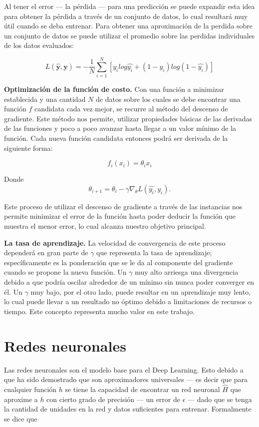 Al tener el error --- la pérdida --- para una predicción se puede expandir esta idea para obtener la pérdida a través de un conjunto de datos, lo cual resultará muy útil cuando se deba entrenar. Para obtener una aproximación de la perdida sobre un conjunto de datos se puede utilizar el promedio sobre las perdidas individuales de los datos evaluados:

\[ L(\mathbf{\hat{y}}, \mathbf{y}) = - \frac{1}{N} \sum_{i = 1}^{N} [y_i log\hat{y_i} + (1 - y_i)log(1 - \hat{y_i})] \]

\textbf{Optimización de la función de costo.} Con una función a minimizar establecida y una cantidad $N$ de datos sobre los cuales se debe encontrar una función $f$ candidata cada vez mejor, se recurre al método del descenso de gradiente. Este método nos permite, utilizar propiedades básicas de las derivadas de las funciones y poco a poco avanzar hasta llegar a un valor mínimo de la función. Cada nueva función candidata entonces podrá ser derivada de la siguiente forma:

\[ f_i(x_i) = \theta_i x_i \]

Donde
\begin{equation}
\label{eq:sgdupdate}
\theta_{i + 1} = \theta_{i} - \gamma \nabla_{\theta} L(\hat{y_i}, y_i).
\end{equation}

Este proceso de utilizar el descenso de gradiente a través de las instancias nos permite  minimizar el error de la función hasta poder deducir la función que muestra el menor error, lo cual alcanza nuestro objetivo principal.

\textbf{La \gls{tasa de aprendizaje}.} La velocidad de convergencia de este proceso dependerá en gran parte de $\gamma$ que representa la tasa de aprendizaje; específicamente es la ponderación que se le da al componente del gradiente cuando se propone la nueva función. Un $\gamma$ muy alto arriesga una divergencia debido a que podría oscilar alrededor de un mínimo sin nunca poder converger en él. Un $\gamma$ muy bajo, por el otro lado, puede resultar en un aprendizaje muy lento, lo cual puede llevar a un resultado no óptimo debido a limitaciones de recursos o tiempo. Este concepto representa mucho valor en este trabajo.

\section{Redes neuronales}

Las redes neuronales son el modelo base para el Deep Learning. Esto debido a que ha sido demostrado que son aproximadores universales \parencite{hornik1989universal} --- es decir que para cualquier función $h$ se tiene la capacidad de encontrar un red neuronal $\hat{H}$ que aproxime a $h$ con cierto grado de precisión --- un error de $\epsilon$ --- dado que se tenga la cantidad de unidades en la red y datos suficientes para entrenar. Formalmente se dice que

